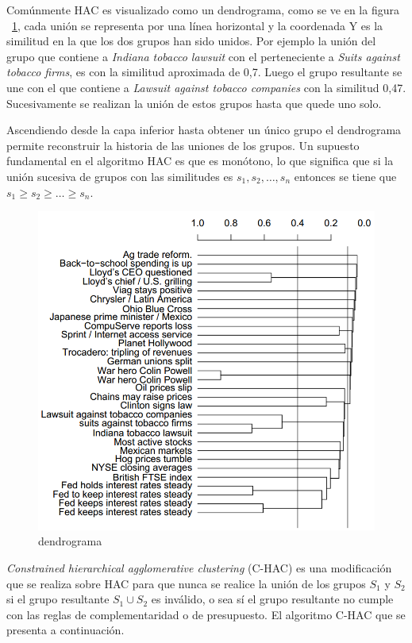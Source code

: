 Comúnmente HAC es visualizado como un dendrograma, como se ve en la figura ~\ref{des:Dendrogram}, cada unión se representa por una línea horizontal y la coordenada Y es la similitud en la que los dos grupos han sido unidos. Por ejemplo la unión del grupo que contiene a \textit{Indiana tobacco lawsuit} con el perteneciente a \textit{Suits against tobacco firms}, es con la similitud aproximada de 0,7. Luego el grupo resultante se une con el que contiene a \textit{Lawsuit against tobacco companies} con la similitud 0,47. Sucesivamente se realizan la unión de estos grupos hasta que quede uno solo.

Ascendiendo desde la capa inferior hasta obtener un único grupo el dendrograma permite reconstruir la historia de las uniones de los grupos. Un supuesto fundamental en el algoritmo HAC es que es monótono, lo que significa que si la unión sucesiva de grupos con las similitudes es $s_1,s_2,\ldots,s_n$ entonces se tiene que $s_1 \geq s_2 \geq \ldots \geq s_n$.

\begin{figure}[H]
  \centering
    \includegraphics[width=1\textwidth]{img/Dendrogram.png}
  \caption{dendrograma}
  \label{des:Dendrogram}
\end{figure}

\textit{Constrained hierarchical agglomerative clustering} (C-HAC) es una modificación que se realiza sobre HAC para que nunca se realice la unión de los grupos $S_1$ y $S_2$ si el grupo resultante $S_1 \cup S_2$ es inválido, o sea sí el grupo resultante no cumple con las reglas de complementaridad o de presupuesto. El algoritmo C-HAC que se presenta a continuación.

